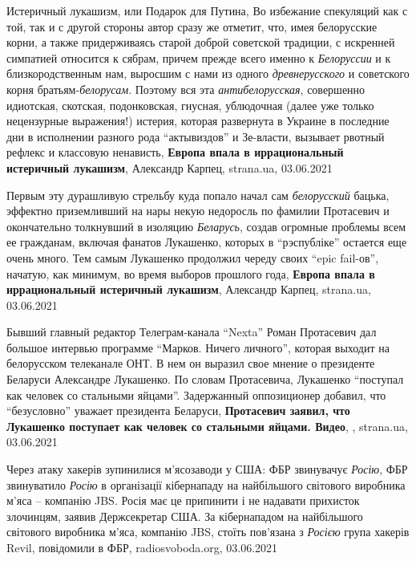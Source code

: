 Истеричный лукашизм, или Подарок для Путина, Во избежание спекуляций как
с той, так и с другой стороны автор сразу же отметит, что, имея белорусские
корни, а также придерживаясь старой доброй советской традиции, с искренней
симпатией относится к сябрам, причем прежде всего именно к \emph{Белоруссии} и к
близкородственным нам, выросшим с нами из одного \emph{древнерусского} и советского
корня братьям-\emph{белорусам}. Поэтому вся эта \emph{антибелорусская}, совершенно идиотская,
скотская, подонковская, гнусная, ублюдочная (далее уже только нецензурные
выражения!) истерия, которая развернута в Украине в последние дни в исполнении
разного рода \enquote{актывиздов} и Зе-власти, вызывает рвотный рефлекс и классовую
ненависть,
\textbf{Европа впала в иррациональный истеричный лукашизм}, Александр Карпец,
strana.ua, 03.06.2021

Первым эту дурашливую стрельбу куда попало начал сам \emph{белорусский} бацька,
эффектно приземливший на нары некую недоросль по фамилии Протасевич и
окончательно толкнувший в изоляцию \emph{Беларусь}, создав огромные проблемы
всем ее гражданам, включая фанатов Лукашенко, которых в \enquote{рэспубліке}
остается еще очень много. Тем самым Лукашенко продолжил череду своих
\enquote{epic fail-ов}, начатую, как минимум, во время выборов прошлого года,
\textbf{Европа впала в иррациональный истеричный лукашизм}, Александр Карпец,
strana.ua, 03.06.2021

Бывший главный редактор Телеграм-канала \enquote{Nexta} Роман Протасевич дал большое
интервью программе \enquote{Марков. Ничего личного}, которая выходит на белорусском
телеканале ОНТ. В нем он выразил свое мнение о президенте Беларуси Александре
Лукашенко.  По словам Протасевича, Лукашенко \enquote{поступал как человек со стальными
яйцами}. Задержанный оппозиционер добавил, что \enquote{безусловно} уважает президента
Беларуси, 
\textbf{Протасевич заявил, что Лукашенко поступает как человек со стальными яйцами. Видео},
, strana.ua, 03.06.2021

Через атаку хакерів зупинилися м'ясозаводи у США: ФБР звинувачує \emph{Росію},
ФБР звинуватило \emph{Росію} в організації кібернападу на найбільшого світового
виробника м'яса – компанію JBS. Росія має це припинити і не надавати прихисток
злочинцям, заявив Держсекретар США.  За кібернападом на найбільшого світового
виробника м'яса, компанію JBS, стоїть пов'язана з \emph{Росією} група хакерів
Revil, повідомили в ФБР, radiosvoboda.org, 03.06.2021

